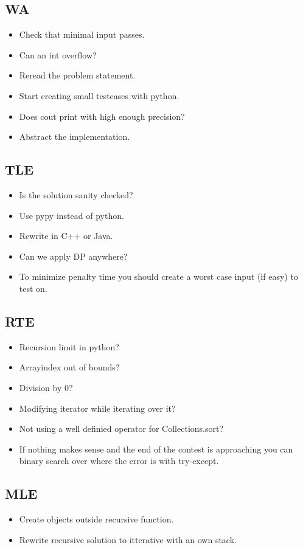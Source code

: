 \documentclass[8pt,a4paper,landscape,oneside]{amsart}
\begin{document}
\begin{multicols*}{3}
    \subsection{WA}
        \begin{itemize}
        \item Check that minimal input passes.
        \item Can an int overflow?
        \item Reread the problem statement.
        \item Start creating small testcases with python.
        \item Does cout print with high enough precision?
        \item Abstract the implementation.
        \end{itemize}
    \subsection{TLE}
        \begin{itemize}
        \item Is the solution sanity checked?
        \item Use pypy instead of python.
        \item Rewrite in C++ or Java.
        \item Can we apply DP anywhere?
        \item To minimize penalty time you should create a worst case input (if easy) to test on.
        \end{itemize}
    \subsection{RTE}
        \begin{itemize}
        \item Recursion limit in python?
        \item Arrayindex out of bounds?
        \item Division by $0$?
        \item Modifying iterator while iterating over it?
        \item Not using a well definied operator for Collections.sort?
        \item If nothing makes sense and the end of the contest is approaching you 
            can binary search over where the error is with try-except.
        \end{itemize}
    \subsection{MLE}
        \begin{itemize}
        \item Create objects outside recursive function.
        \item Rewrite recursive solution to itterative with an own stack.
        \end{itemize}
        

\end{multicols*}
\end{document}
